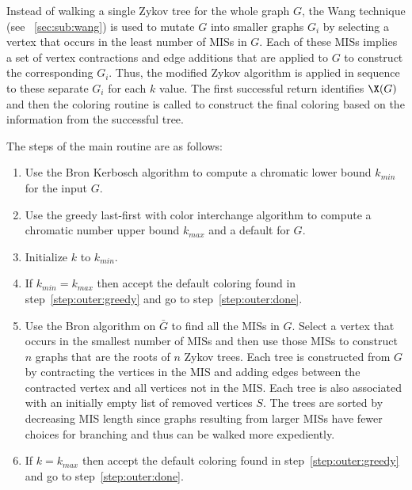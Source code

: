 Instead of walking a single Zykov tree for the whole graph \(G\), the Wang technique (see
\sectionname~\ref{sec:sub:wang}) is used to mutate \(G\) into smaller graphs \(G_i\) by selecting a vertex that
occurs in the least number of MISs in \(G\).  Each of these MISs implies a set of vertex contractions and edge
additions that are applied to \(G\) to construct the corresponding \(G_i\).  Thus, the modified Zykov algorithm is
applied in sequence to these separate \(G_i\) for each \(k\) value.  The first successful return identifies
\(\X(G)\) and then the coloring routine is called to construct the final coloring based on the information from the
successful tree.

The steps of the main routine are as follows:

\begin{enumerate}
\item\label{step:outer:bron} Use the Bron Kerbosch algorithm to compute a chromatic lower bound \(k_{min}\)
  for the input \(G\).

\item\label{step:outer:greedy} Use the greedy last-first with color interchange algorithm to compute a chromatic
  number upper bound \(k_{max}\) and a default  for \(G\).

\item\label{step:outer:initk} Initialize \(k\) to \(k_{min}\).

\item\label{step:outer:match} If \(k_{min}=k_{max}\) then accept the default coloring found in
  step~\ref{step:outer:greedy} and go to step~\ref{step:outer:done}.

\item\label{step:outer:trees} Use the Bron algorithm on \(\bar{G}\) to find all the MISs in \(G\).  Select a vertex
  that occurs in the smallest number of MISs and then use those MISs to construct \(n\) graphs that are the roots
  of \(n\) Zykov trees.  Each tree is constructed from \(G\) by contracting the vertices in the MIS and adding
  edges between the contracted vertex and all vertices not in the MIS.  Each tree is also associated with an
  initially empty list of removed vertices \(S\).  The trees are sorted by decreasing MIS length since graphs
  resulting from larger MISs have fewer choices for branching and thus can be walked more expediently.

\item\label{step:outer:check} If \(k=k_{max}\) then accept the default coloring found in
  step~\ref{step:outer:greedy} and go to step~\ref{step:outer:done}.


\end{enumerate}
